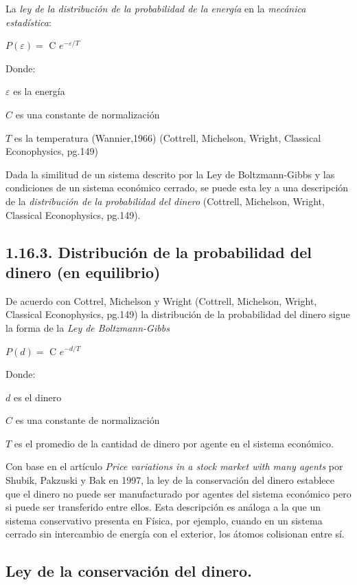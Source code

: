 La \textit{ley de la distribución de la probabilidad de la energía} en la \textit{mecánica estadística}:

\begin{center}
$\mathit{P(\varepsilon)} = $ C $e^{-\varepsilon/\mathit{T}}$ 
\end{center}
Donde:

$\varepsilon$ es la energía

$C$ es una constante de normalización

$\mathit{T}$ es la temperatura (Wannier,1966) (Cottrell, Michelson, Wright, Classical Econophysics, pg.149)

Dada la similitud de un sistema descrito por la Ley de Boltzmann-Gibbs y las condiciones de un sistema económico cerrado, se puede esta ley a una descripción de la \textit{distribución de la probabilidad del dinero}
(Cottrell, Michelson, Wright, Classical Econophysics, pg.149).


\subsection{1.16.3. Distribución de la probabilidad del dinero (en equilibrio)} 


De acuerdo con Cottrel, Michelson y Wright (Cottrell, Michelson, Wright, Classical Econophysics, pg.149) la distribución de la probabilidad del dinero sigue la forma de la \textit{Ley de Boltzmann-Gibbs}


\begin{center}
$\mathit{P(d)} = $ C $e^{-d/\mathit{T}}$ 
\end{center}
Donde:

$d$ es el dinero

$C$ es una constante de normalización

$\mathit{T}$ es el promedio de la cantidad de dinero por agente en el sistema económico.

Con base en el artículo \textit{Price variations in a stock market with many agents} por Shubik, Pakzuski y Bak en 1997, la ley de la conservación del dinero establece que el dinero no puede ser manufacturado por agentes del sistema económico pero si puede ser transferido entre ellos. Esta descripción es análoga a la que un sistema conservativo presenta en Física, por ejemplo, cuando en un sistema cerrado sin intercambio de energía con el exterior, los átomos colisionan entre sí. 
\newpage

\subsection{Ley de la conservación del dinero.} 

